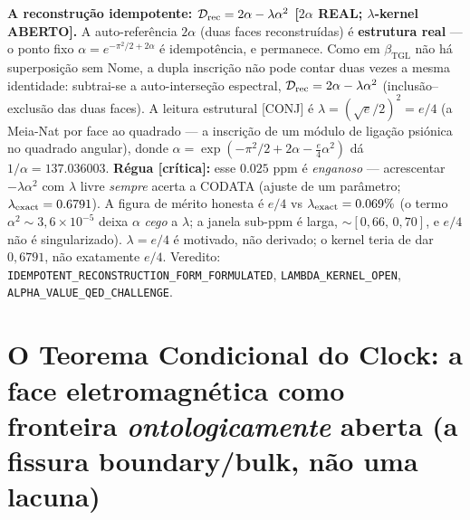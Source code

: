 \documentclass[11pt]{article}
\newcommand{\bTGL}{\beta_{\mathrm{TGL}}}\newcommand{\Msun}{M_{\odot}}\newcommand{\TGL}{\mathrm{TGL}}
\theoremstyle{definition}\newtheorem{deriv}{Derivação}
\begin{document}
\textbf{A reconstrução idempotente: $\mathcal D_{\rm rec}=2\alpha-\lambda\alpha^2$ \textsf{[$2\alpha$ REAL; $\lambda$-kernel ABERTO]}.} A auto-referência $2\alpha$ (duas faces reconstruídas) é \textbf{estrutura real} --- o ponto fixo $\alpha=e^{-\pi^2/2+2\alpha}$ é idempotência, e permanece. Como em $\bTGL$ não há superposição sem Nome, a dupla inscrição não pode contar duas vezes a mesma identidade: subtrai-se a auto-interseção espectral, $\mathcal D_{\rm rec}=2\alpha-\lambda\alpha^2$ (inclusão--exclusão das duas faces). A leitura estrutural \textsf{[CONJ]} é $\lambda=(\sqrt e/2)^2=e/4$ (a Meia-Nat por face ao quadrado --- a inscrição de um módulo de ligação psiónica no quadrado angular), donde $\alpha=\exp(-\pi^2/2+2\alpha-\tfrac e4\alpha^2)$ dá $1/\alpha=137.036003$. \textbf{Régua \textsf{[crítica]}:} esse $0.025$ ppm é \emph{enganoso} --- acrescentar $-\lambda\alpha^2$ com $\lambda$ livre \emph{sempre} acerta a CODATA (ajuste de um parâmetro; $\lambda_{\rm exact}=0.6791$). A figura de mérito honesta é $e/4$ vs $\lambda_{\rm exact}=0.069\%$ (o termo $\alpha^2\sim3{,}6\times10^{-5}$ deixa $\alpha$ \emph{cego} a $\lambda$; a janela sub-ppm é larga, $\sim[0{,}66,\,0{,}70]$, e $e/4$ não é singularizado). $\lambda=e/4$ é motivado, não derivado; o kernel teria de dar $0{,}6791$, não exatamente $e/4$. Veredito: \texttt{IDEMPOTENT\_RECONSTRUCTION\_FORM\_FORMULATED}, \texttt{LAMBDA\_KERNEL\_OPEN}, \texttt{ALPHA\_VALUE\_QED\_CHALLENGE}.

\section{O Teorema Condicional do Clock: a face eletromagnética como fronteira \emph{ontologicamente} aberta (a fissura boundary/bulk, não uma lacuna)}
\end{document}
